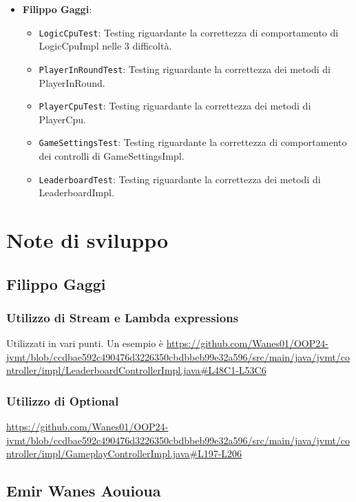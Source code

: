 \documentclass[a4paper,12pt]{report}
\begin{document}
\begin{itemize}
\begin{itemize}
	\end{itemize}
 \item \textbf{Filippo Gaggi}:
	\begin{itemize}
	\item \texttt{LogicCpuTest}: Testing riguardante la correttezza di comportamento di LogicCpuImpl nelle 3 difficoltà.
	\item \texttt{PlayerInRoundTest}: Testing riguardante la correttezza dei metodi di PlayerInRound.
	\item \texttt{PlayerCpuTest}: Testing riguardante la correttezza dei metodi di PlayerCpu.
	\item \texttt{GameSettingsTest}: Testing riguardante la correttezza di comportamento dei controlli di GameSettingsImpl.
	\item \texttt{LeaderboardTest}: Testing riguardante la correttezza dei metodi di LeaderboardImpl.
	\end{itemize}
\end{itemize}

\section{Note di sviluppo}

\subsection{Filippo Gaggi}

\subsubsection{Utilizzo di Stream e Lambda expressions}

Utilizzati in vari punti. Un esempio è \url{https://github.com/Wanes01/OOP24-jvmt/blob/ccdbae592c490476d3226350cbdbbeb99e32a596/src/main/java/jvmt/controller/impl/LeaderboardControllerImpl.java#L48C1-L53C6}

\subsubsection{Utilizzo di Optional}

\url{https://github.com/Wanes01/OOP24-jvmt/blob/ccdbae592c490476d3226350cbdbbeb99e32a596/src/main/java/jvmt/controller/impl/GameplayControllerImpl.java#L197-L206}

\subsection{Emir Wanes Aouioua}
\end{document}
